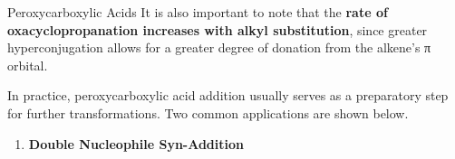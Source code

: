\documentclass[10pt]{article}
\begin{document}
\begin{core}{Peroxycarboxylic Acids}
        It is also important to note that the \textbf{rate of oxacyclopropanation increases with alkyl substitution}, since greater hyperconjugation allows for a greater degree of  donation from the alkene's π orbital.


        In practice, peroxycarboxylic acid addition usually serves as a preparatory step for further transformations. Two common applications are shown below.

        \begin{enumerate}

          \item \textbf{Double Nucleophile Syn-Addition}


\end{enumerate}
\end{core}
\end{document}
